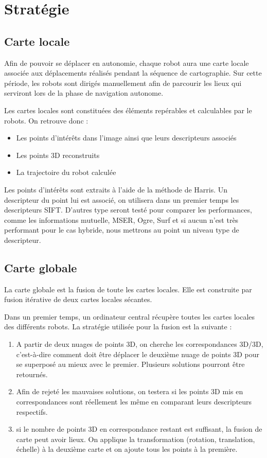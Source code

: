 \section{Stratégie}

\subsection{Carte locale}

Afin de pouvoir se déplacer en autonomie, chaque robot aura une carte locale associée aux déplacements réalisés pendant la séquence de cartographie.
Sur cette période, les robots sont dirigés manuellement afin de parcourir les lieux qui serviront lors de la phase de navigation autonome.

Les cartes locales sont constituées des éléments repérables et calculables par le robots.
On retrouve donc :
\begin{itemize}
\item Les points d'intérêts dans l'image ainsi que leurs descripteurs associés
\item Les points 3D reconstruits
\item La trajectoire du robot calculée
\end{itemize}

Les points d'intérêts sont extraits à l'aide de la méthode de Harris.
Un descripteur du point lui est associé, on utilisera dans un premier temps les descripteurs SIFT.
D'autres type  seront testé pour comparer les performances, comme les informations mutuelle, MSER, Ogre, Surf et si aucun n'est très performant pour le cas hybride, nous mettrons au point un niveau type de descripteur.


\subsection{Carte globale}

La carte globale est la fusion de toute les cartes locales.
Elle est construite par fusion itérative de deux cartes locales sécantes.

Dans un premier temps, un ordinateur central récupère toutes les cartes locales des différents robots.
La stratégie utilisée pour la fusion est la suivante :
\begin{enumerate}
\item A partir de deux nuages de points 3D, on cherche les correspondances 3D/3D, c'est-à-dire comment doit être déplacer le deuxième nuage de points 3D pour se superposé au mieux avec le premier.
Plusieurs solutions pourront être retournés.
\item Afin de rejeté les mauvaises solutions, on testera si les points 3D mis en correspondances sont réellement les même en comparant leurs descripteurs respectifs.
\item si le nombre de points 3D en correspondance restant est suffisant, la fusion de carte peut avoir lieux.
On applique la transformation (rotation, translation, échelle) à la deuxième carte et on ajoute tous les points à la première.
\end{enumerate}

